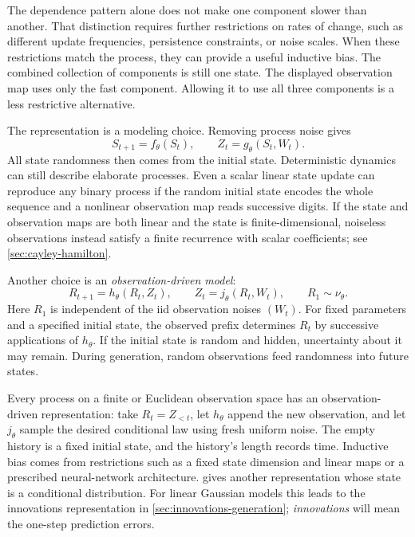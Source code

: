 \documentclass[11pt,twoside]{article}
\theoremstyle{definition}
\theoremstyle{remark}
\begin{document}
The dependence pattern alone does not make one component slower than
another. That distinction requires further restrictions on rates of change,
such as different update frequencies, persistence constraints, or noise
scales. When these restrictions match the process, they can provide a useful
inductive bias. The combined collection of components is still one state.
The displayed observation map uses only the fast component. Allowing it to
use all three components is a less restrictive alternative.

The representation is a modeling choice. Removing process noise gives
\[
 S_{t+1}=f_\theta(S_t),\qquad Z_t=g_\theta(S_t,W_t).
\]
All state randomness then comes from the initial state. Deterministic
dynamics can still describe elaborate processes. Even a scalar linear
state update can reproduce any binary process if the random initial
state encodes the whole sequence and a nonlinear observation map reads
successive digits.
If the state and observation maps are both linear and the state is
finite-dimensional, noiseless observations instead satisfy a finite
recurrence with scalar coefficients; see \cref{sec:cayley-hamilton}.

Another choice is an \emph{observation-driven model}:
\begin{equation}
 R_{t+1}=h_\theta(R_t,Z_t),\qquad
 Z_t=j_\theta(R_t,W_t),\qquad R_1\sim\nu_\theta.
 \label{eq:observation-driven}
\end{equation}
Here \(R_1\) is independent of the iid observation noises \((W_t)\).
For fixed parameters and a specified initial state, the observed prefix
determines \(R_t\) by successive applications of \(h_\theta\).
If the initial state is random and hidden, uncertainty about it may remain.
During generation, random observations feed randomness into future states.

Every process on a finite or Euclidean observation space has an
observation-driven representation: take \(R_t=Z_{<t}\), let
\(h_\theta\) append the new observation, and let \(j_\theta\) sample
the desired conditional law using fresh uniform noise. The empty history
is a fixed initial state, and the history's length records time.
Inductive bias comes from restrictions such as a fixed state dimension
and linear maps or a prescribed neural-network architecture.
 gives another representation whose state is a
conditional distribution. For linear Gaussian models this leads to the
innovations representation in \cref{sec:innovations-generation};
\emph{innovations} will mean the one-step prediction errors.
\end{document}
